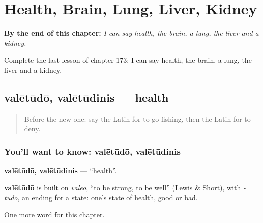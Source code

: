 
\chapter{Health, Brain, Lung, Liver, Kidney}
\label{ch:la-health-brain-lung-liver-kidney}

\begin{chapteropening}
\textbf{By the end of this chapter:} \emph{I can say health, the brain, a lung, the liver and a kidney.}

Complete the last lesson of chapter 173: I can say health, the brain, a lung, the liver and a kidney.
\end{chapteropening}

\section[valētūdō, valētūdinis]{valētūdō, valētūdinis — health}

\label{lesson:LA-C173-valetudo}



\begin{quote}
Before the new one: say the Latin for to go fishing, then the Latin for to deny.
\end{quote}

\subsection*{You'll want to know: valētūdō, valētūdinis}
\textbf{valētūdō, valētūdinis} — \textquotedblleft{}health\textquotedblright{}.

\begin{cousinweb}
\textbf{valētūdō} is built on \emph{valeō}, \textquotedblleft{}to be strong, to be well\textquotedblright{} (Lewis \& Short), with \emph{-tūdō}, an ending for a state: one's state of health, good or bad.
\end{cousinweb}

\begin{grammarlens}[title={What you've built}]
One more word for this chapter.
\end{grammarlens}

